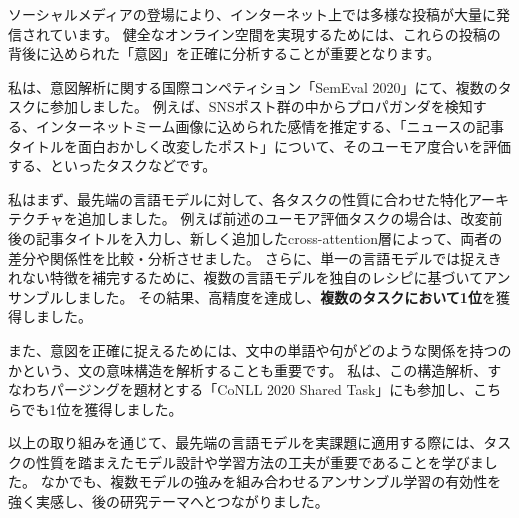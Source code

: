ソーシャルメディアの登場により、インターネット上では多様な投稿が大量に発信されています。
健全なオンライン空間を実現するためには、これらの投稿の背後に込められた「意図」を正確に分析することが重要となります。

私は、意図解析に関する国際コンペティション「SemEval 2020」にて、複数のタスクに参加しました。
例えば、SNSポスト群の中からプロパガンダを検知する、インターネットミーム画像に込められた感情を推定する、「ニュースの記事タイトルを面白おかしく改変したポスト」について、そのユーモア度合いを評価する、といったタスクなどです。

私はまず、最先端の言語モデルに対して、各タスクの性質に合わせた特化アーキテクチャを追加しました。
例えば前述のユーモア評価タスクの場合は、改変前後の記事タイトルを入力し、新しく追加したcross-attention層によって、両者の差分や関係性を比較・分析させました。
さらに、単一の言語モデルでは捉えきれない特徴を補完するために、複数の言語モデルを独自のレシピに基づいてアンサンブルしました。
その結果、高精度を達成し、\textbf{複数のタスクにおいて1位}を獲得しました。

また、意図を正確に捉えるためには、文中の単語や句がどのような関係を持つのかという、文の意味構造を解析することも重要です。
私は、この構造解析、すなわちパージングを題材とする「CoNLL 2020 Shared Task」にも参加し、こちらでも1位を獲得しました。

以上の取り組みを通じて、最先端の言語モデルを実課題に適用する際には、タスクの性質を踏まえたモデル設計や学習方法の工夫が重要であることを学びました。
なかでも、複数モデルの強みを組み合わせるアンサンブル学習の有効性を強く実感し、後の研究テーマへとつながりました。
